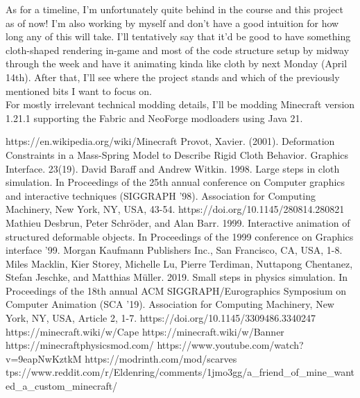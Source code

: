 \documentclass[12pt, twocolumn]{article}
\makeatletter
\newcommand*\wrapletters[1]{\wr@pletters#1\@nil}
\def\wr@pletters#1#2\@nil{#1\allowbreak\if&#2&\else\wr@pletters#2\@nil\fi}
\makeatother
\begin{document}
As for a timeline, I'm unfortunately quite behind in the course and this project as of now! I'm also working by myself and don't have a good intuition for how long any of this will take. I'll tentatively say that it'd be good to have something cloth-shaped rendering in-game and most of the code structure setup by midway through the week and have it animating kinda like cloth by next Monday (April 14th). After that, I'll see where the project stands and which of the previously mentioned bits I want to focus on.\\

For mostly irrelevant technical modding details, I'll be modding Minecraft version 1.21.1 supporting the Fabric and NeoForge modloaders using Java 21.\\


\begin{thebibliography}{}
     https://en.wikipedia.org/wiki/Minecraft
     Provot, Xavier. (2001). Deformation Constraints in a Mass-Spring Model to Describe Rigid Cloth Behavior. Graphics Interface. 23(19). 
     David Baraff and Andrew Witkin. 1998. Large steps in cloth simulation. In Proceedings of the 25th annual conference on Computer graphics and interactive techniques (SIGGRAPH '98). Association for Computing Machinery, New York, NY, USA, 43-54. https://doi.org/10.1145/280814.280821
     Mathieu Desbrun, Peter Schröder, and Alan Barr. 1999. Interactive animation of structured deformable objects. In Proceedings of the 1999 conference on Graphics interface '99. Morgan Kaufmann Publishers Inc., San Francisco, CA, USA, 1-8.
     Miles Macklin, Kier Storey, Michelle Lu, Pierre Terdiman, Nuttapong Chentanez, Stefan Jeschke, and Matthias Müller. 2019. Small steps in physics simulation. In Proceedings of the 18th annual ACM SIGGRAPH/Eurographics Symposium on Computer Animation (SCA '19). Association for Computing Machinery, New York, NY, USA, Article 2, 1-7. https://doi.org/10.1145/3309486.3340247
     https://minecraft.wiki/w/Cape
     https://minecraft.wiki/w/Banner
     https://minecraftphysicsmod.com/
     https://www.youtube.com/watch?v=9eapNwKztkM
     https://modrinth.com/mod/scarves
     \wrapletters{https://www.reddit.com/r/Eldenring/comments/1jmo3gg/a\_friend\_of\_mine\_wanted\_a\_custom\_minecraft/}
\end{thebibliography}
\end{document}
